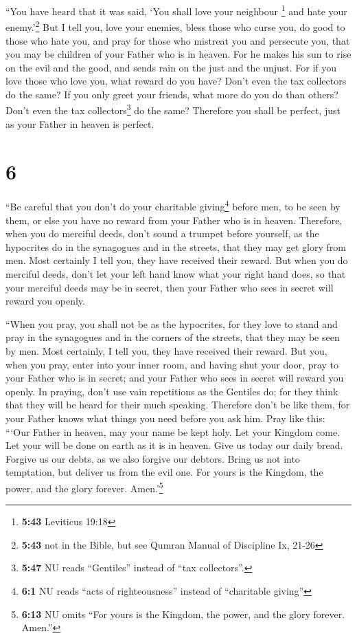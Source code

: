  ``You have heard that it was said, `You shall love your
neighbour \footnote{\textbf{5:43} Leviticus 19:18} and hate your
enemy.'\footnote{\textbf{5:43} not in the Bible, but see Qumran Manual
  of Discipline Ix, 21-26}  But I tell you, love your
enemies, bless those who curse you, do good to those who hate you, and
pray for those who mistreat you and persecute you,  that
you may be children of your Father who is in heaven. For he makes his
sun to rise on the evil and the good, and sends rain on the just and the
unjust.  For if you love those who love you, what reward
do you have? Don't even the tax collectors do the same? 
If you only greet your friends, what more do you do than others? Don't
even the tax collectors\footnote{\textbf{5:47} NU reads ``Gentiles''
  instead of ``tax collectors''.} do the same?  Therefore
you shall be perfect, just as your Father in heaven is perfect.

\hypertarget{section-5}{%
\section{6}\label{section-5}}

 ``Be careful that you don't do your charitable
giving\footnote{\textbf{6:1} NU reads ``acts of righteousness'' instead
  of ``charitable giving''} before men, to be seen by them, or else you
have no reward from your Father who is in heaven. 
Therefore, when you do merciful deeds, don't sound a trumpet before
yourself, as the hypocrites do in the synagogues and in the streets,
that they may get glory from men. Most certainly I tell you, they have
received their reward.  But when you do merciful deeds,
don't let your left hand know what your right hand does, 
so that your merciful deeds may be in secret, then your Father who sees
in secret will reward you openly.

 ``When you pray, you shall not be as the hypocrites, for
they love to stand and pray in the synagogues and in the corners of the
streets, that they may be seen by men. Most certainly, I tell you, they
have received their reward.  But you, when you pray, enter
into your inner room, and having shut your door, pray to your Father who
is in secret; and your Father who sees in secret will reward you openly.
 In praying, don't use vain repetitions as the Gentiles
do; for they think that they will be heard for their much speaking.
 Therefore don't be like them, for your Father knows what
things you need before you ask him.  Pray like this:
```Our Father in heaven, may your name be kept holy.  Let
your Kingdom come. Let your will be done on earth as it is in heaven.
 Give us today our daily bread.  Forgive
us our debts, as we also forgive our debtors.  Bring us
not into temptation, but deliver us from the evil one. For yours is the
Kingdom, the power, and the glory forever. Amen.'\footnote{\textbf{6:13}
  NU omits ``For yours is the Kingdom, the power, and the glory forever.
  Amen.''}

